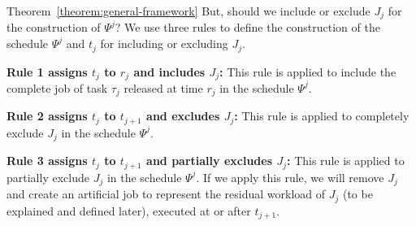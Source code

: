 \begin{appProof}{Theorem~\ref{theorem:general-framework}}
But, should we include or exclude $J_j$ for the construction of
$\Psi^j$?  We use three rules to define the construction of the
schedule $\Psi^j$ and $t_j$ for including or excluding $J_j$.
\begin{compactitem}
\item {\bf Rule 1 assigns $t_j$ to $r_j$ and includes $J_j$:} This rule is applied to
  include the complete job of task $\tau_j$ released at time $r_j$
  in the schedule $\Psi^j$. 
\item {\bf Rule 2 assigns $t_j$ to $t_{j+1}$ and excludes $J_j$:} This rule is applied to
  completely exclude $J_j$ in the schedule $\Psi^j$. 
\item {\bf Rule 3 assigns $t_j$ to $t_{j+1}$ and partially excludes
    $J_j$:} This rule is applied to partially exclude $J_j$ in the
  schedule $\Psi^j$.  If we apply this rule, we will remove $J_j$ and
  create an artificial job to represent the residual workload of $J_j$
  (to be explained and defined later), executed at or after $t_{j+1}$.
\end{compactitem}


\end{appProof}

